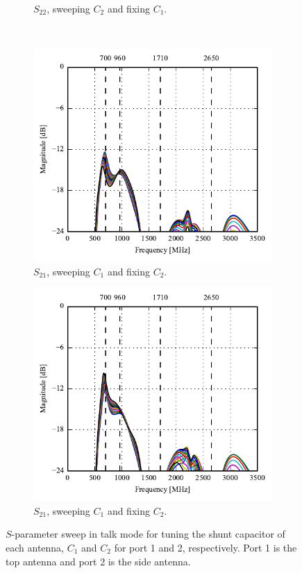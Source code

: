 \begin{figure}[htbp]
\begin{subfigure}[b]{0.49\linewidth}
        \caption{$S_{22}$, sweeping $C_2$ and fixing $C_1$.}
    \end{subfigure}
~
    \begin{subfigure}[b]{0.49\linewidth}
        \centering
        \includegraphics{img/tech_sol/monopole/talk_mode/s21_s11}
        \caption{$S_{21}$, sweeping $C_1$ and fixing $C_2$.}
    \end{subfigure}
    \hfill
    \begin{subfigure}[b]{0.49\linewidth}
        \centering
        \includegraphics{img/tech_sol/monopole/talk_mode/s21_s22}
        \caption{$S_{21}$, sweeping $C_1$ and fixing $C_2$.}
    \end{subfigure}
    \caption{$S$-parameter sweep in talk mode for tuning the shunt capacitor of each antenna, $C_1$ and $C_2$ for port 1 and 2, respectively. Port 1 is the top antenna and port 2 is the side antenna.}
    \label{fig:sparam_mono_talk_mode}
\end{figure}
